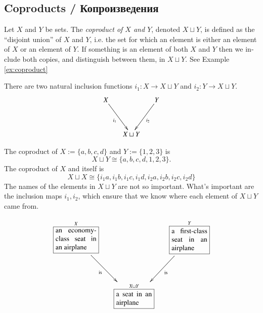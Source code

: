 \documentclass[a4paper]{book}
\def\tn{\textnormal}
\def\to{\rightarrow}
\def\taking{\colon}
\def\iso{\cong}
\newcommand{\LA}[2]{\ar[#1]^-{\tn {#2}}}
\newcommand{\LAL}[2]{\ar[#1]_-{\tn {#2}}}
\newcommand{\obox}[3]{\stackrel{#1}{\fbox{\parbox{#2}{#3}}}}
\theoremstyle{myth}
\newtheorem{exampleENG}[envENG]{\begin{english}Example\end{english}}
\newtheorem{definitionENG}[envENG]{\begin{english}Definition\end{english}}
\newtheorem{exampleRUS}[envRUS]{\begin{russian}Пример\end{russian}}
\newtheorem{definitionRUS}[envRUS]{\begin{russian}Определение\end{russian}}
\begin{document}
\begin{english}

\subsection{Coproducts / Копроизведения}\label{sec:coproducts}

\begin{definitionENG}\label{def:coproduct}
Let $X$ and $Y$ be sets. The {\em coproduct of $X$ and $Y$}, denoted $X\sqcup Y$, is defined as the “disjoint union” of $X$ and $Y$, i.e. the set for which an element is either an element of $X$ or an element of $Y$. If something is an element of both $X$ and $Y$ then we include both copies, and distinguish between them, in $X\sqcup Y$. See Example \ref{ex:coproduct}

There are two natural inclusion functions $i_1\taking X\to X\sqcup Y$ and $i_2\taking Y\to X\sqcup Y$.
$$\xymatrix@=15pt{X\ar[ddr]_{i_1}&&Y\ar[ddl]^{i_2}\\\\&X\sqcup Y}$$
\end{definitionENG}

\begin{definitionRUS}\label{def:coproduct}
\begin{russian} \end{russian}
\end{definitionRUS}

\begin{exampleENG}\label{ex:coproduct}
The coproduct of $X:=\{a,b,c,d\}$ and $Y:=\{1,2,3\}$ is $$X\sqcup Y\iso\{a,b,c,d,1,2,3\}.$$ The coproduct of $X$ and itself is $$X\sqcup X\iso\{i_1a,i_1b,i_1c,i_1d,i_2a,i_2b,i_2c,i_2d\}$$ 
The names of the elements in $X\sqcup Y$ are not so important. What's important are the inclusion maps $i_1,i_2$, which ensure that we know where each element of $X\sqcup Y$ came from.
\end{exampleENG}

\begin{exampleRUS}\label{ex:coproduct}
\begin{russian} \end{russian}
\end{exampleRUS}

\begin{exampleENG}\label{ex:airplanes}
\begin{align}\label{dia:airplane}
\xymatrix@=15pt{
\obox{X}{.8in}{an economy-class seat in an airplane}\LAL{ddr}{is}&&\obox{Y}{.7in}{a first-class seat in an airplane}\LA{ddl}{is}\\\\
&\obox{X\sqcup Y}{.7in}{a seat in an airplane}
}
\end{align}
\end{exampleENG}


\end{english}
\end{document}
